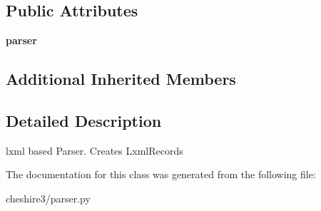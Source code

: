 \subsection*{Public Attributes}
\begin{DoxyCompactItemize}
\item 
\hypertarget{classcheshire3_1_1parser_1_1_lxml_parser_a8299fa5bc4bf5a750652a3f929a8e6bd}{{\bfseries parser}}\label{classcheshire3_1_1parser_1_1_lxml_parser_a8299fa5bc4bf5a750652a3f929a8e6bd}

\end{DoxyCompactItemize}
\subsection*{Additional Inherited Members}


\subsection{Detailed Description}
\begin{DoxyVerb}lxml based Parser.  Creates LxmlRecords \end{DoxyVerb}
 

The documentation for this class was generated from the following file\-:\begin{DoxyCompactItemize}
\item 
cheshire3/parser.\-py\end{DoxyCompactItemize}
